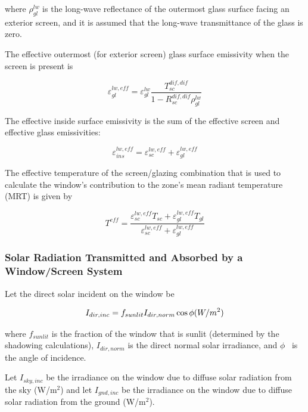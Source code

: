 where \(\rho_{gl}^{lw}\) is the long-wave reflectance of the outermost glass surface facing an exterior screen, and it is assumed that the long-wave transmittance of the glass is zero.

The effective outermost (for exterior screen) glass surface emissivity when the screen is present is

\begin{equation}
\varepsilon_{gl}^{lw,eff} = \varepsilon_{gl}^{lw}\frac{{T_{sc}^{dif,dif}}}{{1 - R_{sc}^{dif,dif}\rho_{gl}^{lw}}}
\end{equation}

The effective inside surface emissivity is the sum of the effective screen and effective glass emissivities:

\begin{equation}
\varepsilon_{ins}^{lw,eff} = \varepsilon_{sc}^{lw,eff} + \varepsilon_{gl}^{lw,eff}
\end{equation}

The effective temperature of the screen/glazing combination that is used to calculate the window's contribution to the zone's mean radiant temperature (MRT) is given by

\begin{equation}
{T^{eff}} = \frac{{\varepsilon_{sc}^{lw,eff}{T_{sc}} + \varepsilon_{gl}^{lw,eff}{T_{gl}}}}{{\varepsilon_{sc}^{lw,eff} + \varepsilon_{gl}^{lw,eff}}}
\end{equation}

\subsubsection{Solar Radiation Transmitted and Absorbed by a Window/Screen System}\label{solar-radiation-transmitted-and-absorbed-by-a-windowscreen-system}

Let the direct solar incident on the window be

\begin{equation}
{I_{dir,inc}} = {f_{sunlit}}{I_{dir,norm}}\cos \phi {\rm{    }}(W/{m^2})
\end{equation}

where \({f_{sunlit}}\) is the fraction of the window that is sunlit (determined by the shadowing calculations), \({I_{dir,norm}}\) is the direct normal solar irradiance, and \(\phi\) ~is the angle of incidence.

Let \({I_{sky,inc}}\) be the irradiance on the window due to diffuse solar radiation from the sky (W/m\(^{2}\)) and let \({I_{gnd,inc}}\) be the irradiance on the window due to diffuse solar radiation from the ground (W/m\(^{2}\)).

